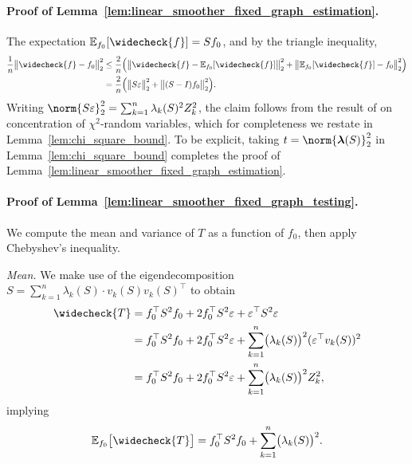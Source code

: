 \documentclass[twoside]{article}
\newcommand{\1}{\mathbf{1}}
\newcommand{\lambdavec}{\boldsymbol{\lambda}}
\newcommand{\Ebb}{\mathbb{E}}
\newcommand{\wc}[1]{\widecheck{#1}}
\theoremstyle{definition}
\theoremstyle{remark}
\begin{document}
\paragraph{Proof of Lemma~\ref{lem:linear_smoother_fixed_graph_estimation}.}
The expectation $\Ebb_{f_0}[\wc{f}] = Sf_0$, and by the triangle inequality,
\begin{align*}
\frac{1}{n}\bigl\|\wc{f} - f_0\bigr\|_2^2 & \leq \frac{2}{n}\Bigl(\bigl\|\wc{f} - \Ebb_{f_0}[\wc{f}]\bigr\|_2^2 + \bigl\|\Ebb_{f_0}[\wc{f}] - f_0\bigr\|_2^2\Bigr) \\ 
& = \frac{2}{n}\Bigl(\bigl\|S\varepsilon\bigr\|_2^2 + \bigl\|(S - I)f_0\bigr\|_2^2\Bigr).
\end{align*}
Writing $\norm{S\varepsilon}_2^2 = \sum_{k = 1}^{n} \lambda_k(S)^2 Z_k^2$, the claim follows from the result of \citet{laurent00} on concentration of $\chi^2$-random variables, which for completeness we restate in Lemma~\ref{lem:chi_square_bound}. To be explicit, taking $t = \norm{\lambdavec(S)}_2^2$ in Lemma~\ref{lem:chi_square_bound} completes the proof of Lemma~\ref{lem:linear_smoother_fixed_graph_estimation}. 

\paragraph{Proof of Lemma~\ref{lem:linear_smoother_fixed_graph_testing}.}
We compute the mean and variance of $T$ as a function of $f_0$, then apply Chebyshev's inequality.

\textit{Mean.} We make use of the eigendecomposition $S = \sum_{k = 1}^{n} \lambda_k(S) \cdot v_k(S) v_k(S)^{\top}$ to obtain
\begin{equation}
\label{pf:linear_smoother_fixed_graph_testing1}
\begin{aligned}
\wc{T} & = f_0^{\top} S^2 f_0 + 2 f_0^{\top} S^2 \varepsilon + \varepsilon^{\top} S^2 \varepsilon \\
& = f_0^{\top} S^2 f_0 + 2 f_0^{\top} S^2 \varepsilon + \sum_{k = 1}^{n}  \bigl(\lambda_k(S)\bigr)^2 (\varepsilon^{\top} v_k(S))^2 \\
& = f_0^{\top} S^2 f_0 + 2 f_0^{\top} S^2 \varepsilon + \sum_{k = 1}^{n}  \bigl(\lambda_k(S)\bigr)^2 Z_k^2,
\end{aligned}
\end{equation}
implying
\begin{equation}
\label{pf:linear_smoother_fixed_graph_testing_mean}
\Ebb_{f_0}\bigl[\wc{T}\bigr] = f_0^{\top} S^2 f_0 + \sum_{k = 1}^{n} \bigl(\lambda_k(S)\bigr)^2.
\end{equation}
\end{document}
